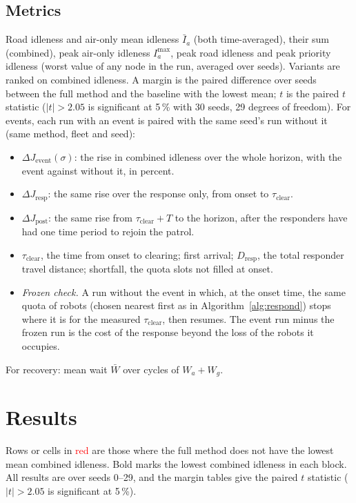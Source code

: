 \documentclass[11pt]{article}
\newcommand{\tie}[1]{\textcolor{red}{#1}}
\theoremstyle{definition}
\theoremstyle{plain}
\begin{document}
\subsection{Metrics}
Road idleness and air-only mean idleness $\bar I_a$ (both time-averaged),
their sum (combined), peak air-only idleness $I_a^{\max}$, peak road
idleness and peak priority idleness (worst value of any node in the run,
averaged over seeds). Variants are ranked on combined idleness. A margin
is the paired difference over seeds between the full method and the
baseline with the lowest mean; $t$ is the paired $t$ statistic ($|t| > 2.05$
is significant at 5\,\% with 30 seeds, 29 degrees of freedom). For events, each run with an
event is paired with the same seed's run without it (same method, fleet
and seed):
\begin{itemize}
\item $\Delta J_{\mathrm{event}}(\sigma)$: the rise in combined idleness
over the whole horizon, with the event against without it, in percent.
\item $\Delta J_{\mathrm{resp}}$: the same rise over the response only,
from onset to $\tau_{\mathrm{clear}}$.
\item $\Delta J_{\mathrm{post}}$: the same rise from
$\tau_{\mathrm{clear}} + T$ to the horizon, after the responders have had
one time period to rejoin the patrol.
\item $\tau_{\mathrm{clear}}$, the time from onset to clearing; first
arrival; $D_{\mathrm{resp}}$, the total responder travel distance;
shortfall, the quota slots not filled at onset.
\item \emph{Frozen check.} A run without the event in which, at the onset
time, the same quota of robots (chosen nearest first as in
Algorithm~\ref{alg:respond}) stops where it is for the measured
$\tau_{\mathrm{clear}}$, then resumes. The event run minus the frozen run
is the cost of the response beyond the loss of the robots it occupies.
\end{itemize}
For recovery: mean wait $\bar W$ over cycles of $W_a + W_g$.

\section{Results}
\label{sec:results}

Rows or cells in \tie{red} are those where the full method does not have the
lowest mean combined idleness. Bold marks the lowest combined idleness in
each block. All results are over seeds 0--29, and the margin tables give
the paired $t$ statistic ($|t| > 2.05$ is significant at 5\,\%).
\end{document}
